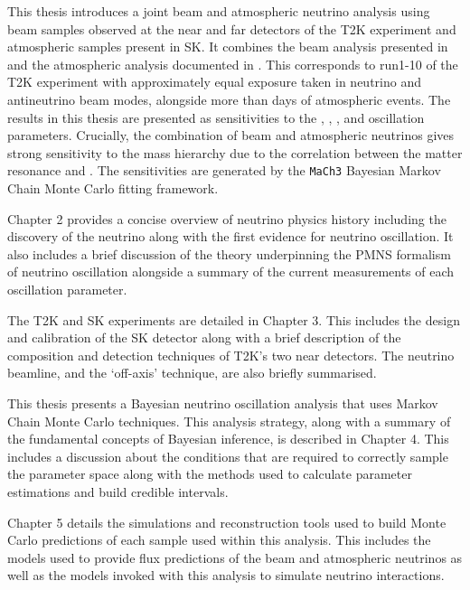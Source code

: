 This thesis introduces a joint beam and atmospheric neutrino analysis using beam samples observed at the near and far detectors of the T2K experiment and atmospheric samples present in SK. It combines the beam analysis presented in \cite{Dunne2020-uf} and the atmospheric analysis documented in \cite{Jiang2019-iw}. This corresponds to run1-10 of the T2K experiment with approximately equal exposure taken in neutrino and antineutrino beam modes, alongside more than  days of atmospheric events. The results in this thesis are presented as sensitivities to the , , , and  oscillation parameters. Crucially, the combination of beam and atmospheric neutrinos gives strong sensitivity to the mass hierarchy due to the correlation between the matter resonance and . The sensitivities are generated by the \texttt{MaCh3} Bayesian Markov Chain Monte Carlo fitting framework.

Chapter 2 provides a concise overview of neutrino physics history including the discovery of the neutrino along with the first evidence for neutrino oscillation. It also includes a brief discussion of the theory underpinning the PMNS formalism of neutrino oscillation alongside a summary of the current measurements of each oscillation parameter.

The T2K and SK experiments are detailed in Chapter 3. This includes the design and calibration of the SK detector along with a brief description of the composition and detection techniques of T2K's two near detectors. The neutrino beamline, and the `off-axis' technique, are also briefly summarised. 

This thesis presents a Bayesian neutrino oscillation analysis that uses Markov Chain Monte Carlo techniques. This analysis strategy, along with a summary of the fundamental concepts of Bayesian inference, is described in Chapter 4. This includes a discussion about the conditions that are required to correctly sample the parameter space along with the methods used to calculate parameter estimations and build credible intervals.

Chapter 5 details the simulations and reconstruction tools used to build Monte Carlo predictions of each sample used within this analysis. This includes the models used to provide flux predictions of the beam and atmospheric neutrinos as well as the models invoked with this analysis to simulate neutrino interactions.

